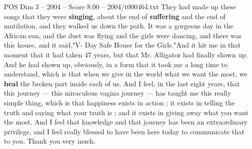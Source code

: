 \begin{textsample}{POS Dim 3 – 2004 – Score 8.00 – 2004/t000464.txt}
They had made up these songs that they were \textbf{singing}, about the end of \textbf{suffering} and the end of mutilation, and they walked us down the path.
It was a gorgeous day in the African sun, and the dust was flying and the girls were dancing, and there was this house, and it said,"V- Day Safe House for the Girls."And it hit me in that moment that it had taken 47 years, but that Mr.
Alligator had finally shown up.
And he had shown up, obviously, in a form that it took me a long time to understand, which is that when we give in the world what we want the most, we \textbf{heal} the broken part inside each of us.
And I feel, in the last eight years, that this journey — this miraculous vagina journey — has taught me this really simple thing, which is that happiness exists in action ; it exists in telling the truth and saying what your truth is ; and it exists in giving away what you want the most.
And I feel that knowledge and that journey has been an extraordinary privilege, and I feel really blessed to have been here today to communicate that to you.
Thank you very much.

\end{textsample}
